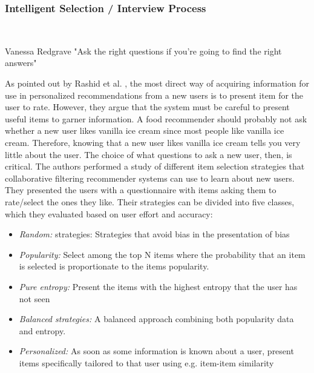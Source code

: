 \subsubsection{Intelligent Selection / Interview Process}\mbox{}\\


\begin{chapquote}[30pt]{Vanessa Redgrave}
  "Ask the right questions if you're going to find the right answers"
\end{chapquote}


As pointed out by Rashid et al. \cite{Rashid2002}, the most direct way of
acquiring information for use in personalized recommendations from a new users
is to present item for the user to rate. However, they argue that the system
must be careful to present useful items to garner information. A food
recommender should probably not ask whether a new user likes vanilla ice cream
since most people like vanilla ice cream. Therefore, knowing that a new user
likes vanilla ice cream tells you very little about the user. The choice of
what questions to ask a new user, then, is critical. The authors performed a
study of different item selection strategies that collaborative filtering
recommender systems can use to learn about new users. They presented the users
with a questionnaire with items asking them to rate/select the ones they like.
Their strategies can be divided into five classes, which they evaluated based
on user effort and accuracy:

\begin{itemize}
\item \emph{Random:} strategies: Strategies that avoid bias in the presentation
of bias
\item \emph{Popularity:} Select among the top N items where the probability
that an item is selected is proportionate to the items popularity.
\item \emph{Pure entropy:} Present the items with the highest entropy that the
user has not seen
\item \emph{Balanced strategies:} A balanced approach combining both popularity
data and entropy.
\item \emph{Personalized:} As soon as some information is known about a user,
present items specifically tailored to that user using e.g. item-item
similarity
\end{itemize}

